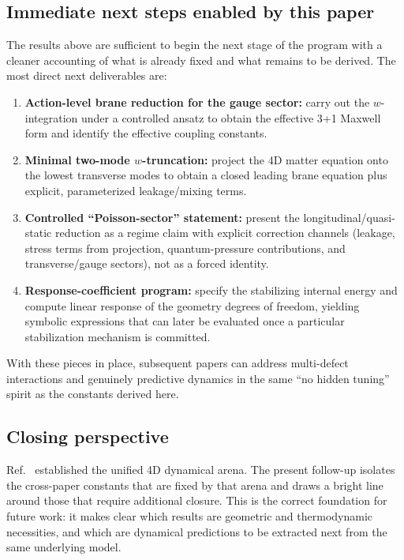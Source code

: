\documentclass[11pt]{article}
\begin{document}
\subsection*{Immediate next steps enabled by this paper}
The results above are sufficient to begin the next stage of the program with a cleaner accounting of what is already fixed and what remains to be derived. The most direct next deliverables are:

\begin{enumerate}
  \item \textbf{Action-level brane reduction for the gauge sector:}
  carry out the \(w\)-integration under a controlled ansatz to obtain the effective 3+1 Maxwell form and identify the effective coupling constants.

  \item \textbf{Minimal two-mode \(w\)-truncation:}
  project the 4D matter equation onto the lowest transverse modes to obtain a closed leading brane equation plus explicit, parameterized leakage/mixing terms.

  \item \textbf{Controlled ``Poisson-sector'' statement:}
  present the longitudinal/quasi-static reduction as a regime claim with explicit correction channels (leakage, stress terms from projection, quantum-pressure contributions, and transverse/gauge sectors), not as a forced identity.

  \item \textbf{Response-coefficient program:}
  specify the stabilizing internal energy and compute linear response of the geometry degrees of freedom, yielding symbolic expressions that can later be evaluated once a particular stabilization mechanism is committed.
\end{enumerate}

\noindent
With these pieces in place, subsequent papers can address multi-defect interactions and genuinely predictive dynamics in the same ``no hidden tuning'' spirit as the constants derived here.

\subsection*{Closing perspective}
Ref.~\cite{norris2026_4d_model} established the unified 4D dynamical arena. The present follow-up isolates the cross-paper constants that are fixed by that arena and draws a bright line around those that require additional closure. This is the correct foundation for future work: it makes clear which results are geometric and thermodynamic necessities, and which are dynamical predictions to be extracted next from the same underlying model.
\end{document}
